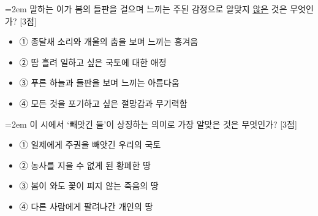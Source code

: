 \documentclass[10pt,a4paper]{article}
\newcommand{\qnum}[1]{%
  \tikz[baseline=(num.base)]{%
    \node[circle, fill=numCircle, text=white, inner sep=0pt,
          minimum size=18pt, font=\small\bfseries] (num) {#1};%
  }%
}
\newcommand{\pts}[1]{%
  \hfill\textcolor{ptsBadge}{[#1점]}%
}
\begin{document}
\vspace{4mm}
\begin{minipage}{\columnwidth}
{\hangindent=2em
\qnum{18}\enspace 말하는 이가 봄의 들판을 걸으며 느끼는 주된 감정으로 알맞지 \uline{않은} 것은 무엇인가? \pts{3}
\par}

\vspace{3mm}
\begin{itemize}[leftmargin=2.5em, labelsep=0.3em, label={}, itemsep=4pt, parsep=1pt, topsep=0pt]
  \item ① 종달새 소리와 개울의 춤을 보며 느끼는 흥겨움
  \item ② 땀 흘려 일하고 싶은 국토에 대한 애정
  \item ③ 푸른 하늘과 들판을 보며 느끼는 아름다움
  \item ④ 모든 것을 포기하고 싶은 절망감과 무기력함
\end{itemize}
\end{minipage}
\vspace{4mm}

\vspace{4mm}
\begin{minipage}{\columnwidth}
{\hangindent=2em
\qnum{19}\enspace 이 시에서 ‘빼앗긴 들’이 상징하는 의미로 가장 알맞은 것은 무엇인가? \pts{3}
\par}

\vspace{3mm}
\begin{itemize}[leftmargin=2.5em, labelsep=0.3em, label={}, itemsep=4pt, parsep=1pt, topsep=0pt]
  \item ① 일제에게 주권을 빼앗긴 우리의 국토
  \item ② 농사를 지을 수 없게 된 황폐한 땅
  \item ③ 봄이 와도 꽃이 피지 않는 죽음의 땅
  \item ④ 다른 사람에게 팔려나간 개인의 땅
\end{itemize}
\end{minipage}
\vspace{4mm}
\end{document}
